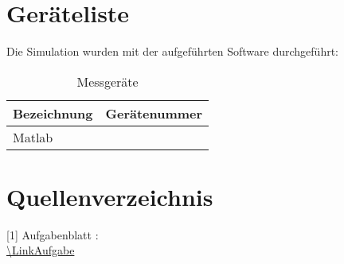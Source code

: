 %
	\newpage
	
	\section{Geräteliste}
	\textmd{Die Simulation wurden mit der aufgeführten Software durchgeführt:}
	\begin{table}[H]
		\centering\bgroup{}%
		\begin{tabular}{|p{6cm}|l|}
			\hline\rowcolor{lightgray}
			Bezeichnung     & Gerätenummer \\ \hline
			Matlab 	& 			   \\ \hline
		\end{tabular}
		\egroup
		\caption{Messgeräte}  %
	\end{table}
	
	\section{Quellenverzeichnis}
	[1] Aufgabenblatt \Versuch:\\ \url{\LinkAufgabe}
	\listoffigures%
	\listoftables%
	
%